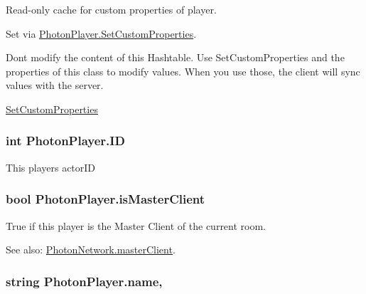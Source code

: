 Read-\/only cache for custom properties of player. 

Set via \hyperlink{class_photon_player_af8815abb8edaafbe6bddbf328f9612fb}{Photon\+Player.\+Set\+Custom\+Properties}.

Don\textquotesingle{}t modify the content of this Hashtable. Use Set\+Custom\+Properties and the properties of this class to modify values. When you use those, the client will sync values with the server. 

\hyperlink{class_photon_player_af8815abb8edaafbe6bddbf328f9612fb}{Set\+Custom\+Properties} 
\subsubsection[{\texorpdfstring{ID}{ID}}]{\setlength{\rightskip}{0pt plus 5cm}int Photon\+Player.\+ID\hspace{0.3cm}{\ttfamily [get]}}\hypertarget{class_photon_player_ac363d86e7c6ea63573e0ecfda7f7eaa7}{}\label{class_photon_player_ac363d86e7c6ea63573e0ecfda7f7eaa7}


This player\textquotesingle{}s actor\+ID

\subsubsection[{\texorpdfstring{is\+Master\+Client}{isMasterClient}}]{\setlength{\rightskip}{0pt plus 5cm}bool Photon\+Player.\+is\+Master\+Client\hspace{0.3cm}{\ttfamily [get]}}\hypertarget{class_photon_player_ade88a2875960de99e5ab98fc6db1650c}{}\label{class_photon_player_ade88a2875960de99e5ab98fc6db1650c}


True if this player is the Master Client of the current room. 

See also\+: \hyperlink{class_photon_network_aa7e51b5e5f9f8b89f057096f47d11c5b}{Photon\+Network.\+master\+Client}. 
\subsubsection[{\texorpdfstring{name}{name}}]{\setlength{\rightskip}{0pt plus 5cm}string Photon\+Player.\+name\hspace{0.3cm}{\ttfamily [get]}, {\ttfamily [set]}}\hypertarget{class_photon_player_a74e5bb916dbfdb6960b8f2f11fa6aba9}{}\label{class_photon_player_a74e5bb916dbfdb6960b8f2f11fa6aba9}


